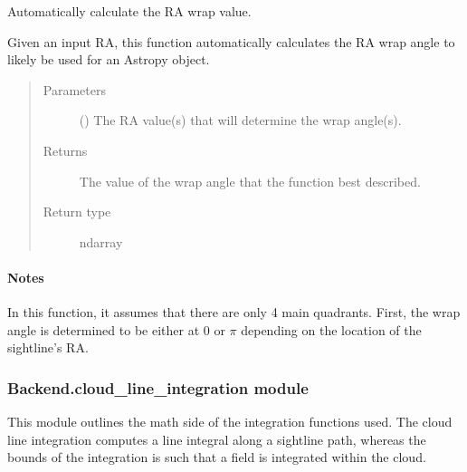 \documentclass[letterpaper,10pt,english]{sphinxmanual}
\begin{document}
\begin{fulllineitems}
\label{\detokenize{Backend.astronomical_coordinates:Backend.astronomical_coordinates.auto_ra_wrap_angle}}
Automatically calculate the RA wrap value.

Given an input RA, this function automatically calculates the RA wrap
angle to likely be used for an Astropy  object.
\begin{quote}\begin{description}
\item[{Parameters}] \leavevmode
{} () \textendash{} The RA value(s) that will determine the wrap angle(s).

\item[{Returns}] \leavevmode
{} \textendash{} The value of the wrap angle that the function best described.

\item[{Return type}] \leavevmode
ndarray

\end{description}\end{quote}
\paragraph{Notes}

In this function, it assumes that there are only 4 main quadrants. First,
the wrap angle is determined to be either at \(0\) or \(\pi\) depending on the location of the sightline’s RA.

\end{fulllineitems}



\subsubsection{Backend.cloud\_line\_integration module}
\label{\detokenize{Backend.cloud_line_integration:module-Backend.cloud_line_integration}}\label{\detokenize{Backend.cloud_line_integration:backend-cloud-line-integration-module}}\label{\detokenize{Backend.cloud_line_integration::doc}}
This module outlines the math side of the integration functions used. The
cloud line integration computes a line integral along a sightline path,
whereas the bounds of the integration is such that a field is integrated
within the cloud.
\end{document}
